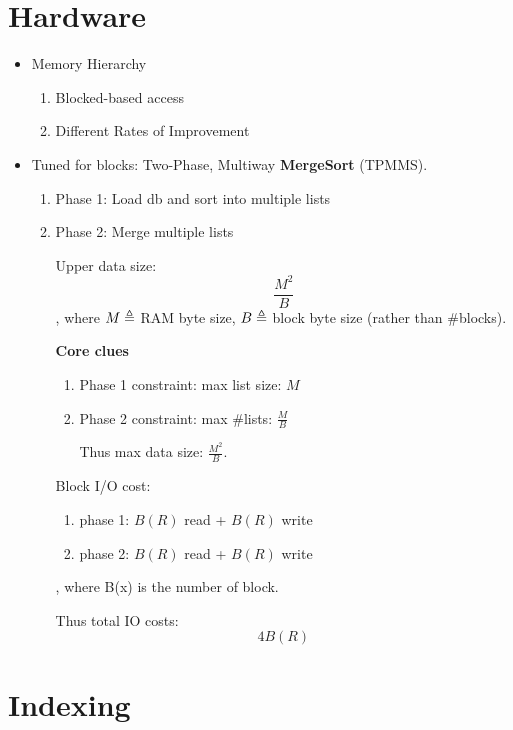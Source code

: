 \documentclass[a4paper]{report}
\begin{document}
\chapter{Hardware}
\begin{itemize}
\item Memory Hierarchy 
\begin{enumerate}
\item Blocked-based access 
\item Different Rates of Improvement 
\end{enumerate}
\item Tuned for blocks: Two-Phase, Multiway \textbf{MergeSort} (TPMMS). 
\begin{enumerate}
\item Phase 1: Load db and sort into multiple lists 
\item Phase 2: Merge multiple lists 

Upper data size: 
$$
\frac{M^2}{B}
$$
, where $M\triangleq$ RAM byte size, $B\triangleq$ block byte size (rather than \#blocks).

\textbf{Core clues}
\begin{enumerate}
\item Phase 1 constraint: max list size: $M$
\item Phase 2 constraint: max \#lists: $\frac{M}{B}$

Thus max data size: $\frac{M^2}{B}$. 
\end{enumerate}

Block I/O cost:
\begin{enumerate}
\item phase 1: $B(R)$ read + $B(R)$ write 
\item phase 2: $B(R)$ read + $B(R)$ write 
\end{enumerate}
, where B(x) is the number of block. 

Thus total IO costs:
$$
4B(R) 
$$
\end{enumerate}
\end{itemize}


\chapter{Indexing}
\end{document}
